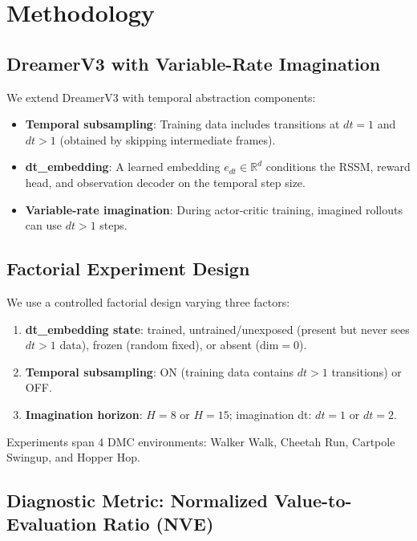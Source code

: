 \documentclass[10pt,letterpaper]{article}
\begin{document}
\section{Methodology}

\subsection{DreamerV3 with Variable-Rate Imagination}

We extend DreamerV3 \cite{hafner2023mastering} with temporal abstraction components:
\begin{itemize}[leftmargin=*,nosep]
    \item \textbf{Temporal subsampling}: Training data includes transitions at $dt=1$ and $dt>1$ (obtained by skipping intermediate frames).
    \item \textbf{dt\_embedding}: A learned embedding $e_{dt} \in \mathbb{R}^d$ conditions the RSSM, reward head, and observation decoder on the temporal step size.
    \item \textbf{Variable-rate imagination}: During actor-critic training, imagined rollouts can use $dt>1$ steps.
\end{itemize}

\subsection{Factorial Experiment Design}

We use a controlled factorial design varying three factors:
\begin{enumerate}[leftmargin=*,nosep]
    \item \textbf{dt\_embedding state}: trained, untrained/unexposed (present but never sees $dt>1$ data), frozen (random fixed), or absent ($\text{dim}=0$).
    \item \textbf{Temporal subsampling}: ON (training data contains $dt>1$ transitions) or OFF.
    \item \textbf{Imagination horizon}: $H=8$ or $H=15$; imagination dt: $dt=1$ or $dt=2$.
\end{enumerate}
Experiments span 4 DMC environments: Walker Walk, Cheetah Run, Cartpole Swingup, and Hopper Hop.

\subsection{Diagnostic Metric: Normalized Value-to-Evaluation Ratio (NVE)}
\end{document}
